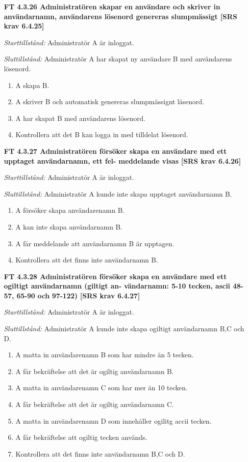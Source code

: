 \documentclass[a4paper]{article}
\begin{document}
\textbf{FT 4.3.26 Administratören skapar en användare och skriver in användarnamn, användarens lösenord genereras slumpmässigt [SRS krav 6.4.25]}

\emph{Starttillstånd:} Administratör A är inloggat.

\emph{Sluttillstånd:} Administratör A har skapat  ny  användare B med användarens  lösenord.

\begin{enumerate}
\item A skapa B.
\item A skriver B och automatisk genereras slumpmässignt läsenord.
\item A har skapat B med användarens lösenord.
\item Kontrollera att det B kan logga in med tilldelat lösenord.
\end{enumerate}

\textbf{FT 4.3.27 Administratören försöker skapa en användare med ett upptaget användarnamn, ett fel- meddelande visas [SRS krav 6.4.26]}

\emph{Starttillstånd:} Administratör A är inloggat.

\emph{Sluttillstånd:} Administratör A kunde inte skapa upptaget användarnamn B.

\begin{enumerate}
\item A försöker skapa användarenamn B.
\item A kan inte  skapa användarnamn B. 
\item A får meddelande att användarnamn B är upptagen.
\item Kontrollera att det finns inte användarnamn B.
\end{enumerate}

\textbf{FT 4.3.28 Administratören försöker skapa en användare med ett ogiltigt användarnamn (giltigt an- vändarnamn: 5-10 tecken, ascii 48-57, 65-90 och 97-122) [SRS krav 6.4.27]} 

\emph{Starttillstånd:} Administratör A är inloggat.

\emph{Sluttillstånd:} Administratör A kunde inte skapa ogiltigt användarnamn B,C och D.

\begin{enumerate}
\item A matta in användarenamn B som har mindre än 5 tecken.
\item A får bekräftelse att det är ogiltig användarnamn B.
\item A matta in användarenamn C som har mer än 10 tecken.
\item A får bekräftelse att det är ogiltig användarnamn C.
\item A matta in användarenamn D som innehåller ogilitg accii tecken.
\item A får bekräftelse att ogiltig tecken används.
\item Kontrollera att det finns inte användarnamn B,C och D.
\end{enumerate}
\end{document}
